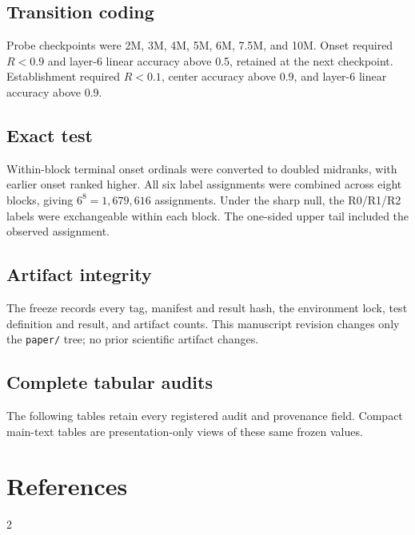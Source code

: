 \documentclass[11pt]{article}
\begin{document}
\subsection{Transition coding}
Probe checkpoints were 2M, 3M, 4M, 5M, 6M, 7.5M, and 10M. Onset required
$R<0.9$ and layer-6 linear accuracy above 0.5, retained at the next checkpoint.
Establishment required $R<0.1$, center accuracy above 0.9, and layer-6 linear
accuracy above 0.9.

\subsection{Exact test}
Within-block terminal onset ordinals were converted to doubled midranks, with
earlier onset ranked higher. All six label assignments were combined across
eight blocks, giving $6^8=1,679,616$ assignments.
Under the sharp null, the R0/R1/R2 labels were exchangeable within each block.
The one-sided upper tail included the observed assignment.

\subsection{Artifact integrity}
The freeze records every tag, manifest and result hash, the environment lock,
test definition and result, and artifact counts. This manuscript revision
changes only the \texttt{paper/} tree; no prior scientific artifact changes.

\subsection{Complete tabular audits}
The following tables retain every registered audit and provenance field.
Compact main-text tables are presentation-only views of these same frozen
values.










\section*{References}
\renewcommand{\bibsection}{}
\begingroup
\footnotesize
\setlength{\bibsep}{0pt plus 0.3ex}
\begin{multicols}{2}


\end{multicols}
\endgroup
\end{document}
